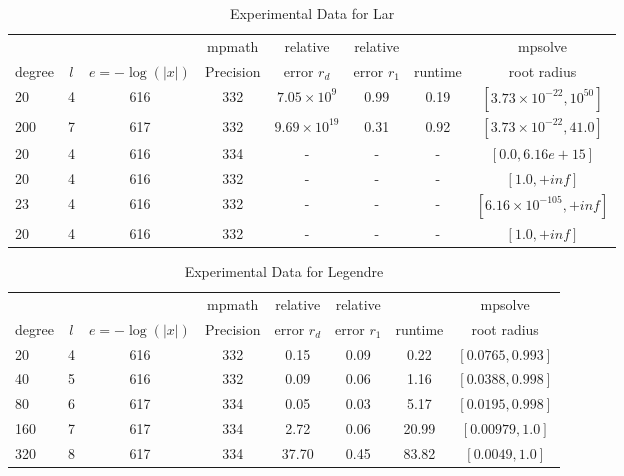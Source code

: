 \documentclass[sigconf]{acmart}
\begin{document}
\begin{table}[t]
\caption{Experimental Data for Lar}
\label{tab:lar}
\vskip 0.15in
\begin{center}
\begin{small}
\begin{sc}
\begin{tabular}{lccccccc}
\toprule
&  &  & mpmath & relative  & relative &  & mpsolve \\
degree  & $l$& $e=-\log(|x|)$& Precision &error $r_d$       & error $r_1$ &runtime& root radius\\
\midrule
   20  & 4 & 616 & 332 & $7.05 \times 10^9$ & 0.99 & 0.19 & $[3.73 \times 10^{-22}, 10^{50}]$ \\ %
  200 & 7 & 617 & 332 & $9.69 \times 10^{19}$ & 0.31 & 0.92 & $[3.73 \times 10^{-22}, 41.0]$\\ %
    20 & 4 & 616 & 334 & - & - & - & $[0.0, 6.16e+15]$\\ %
    20 & 4 & 616 & 332 & - & - & - & $[1.0, +inf]$\\ %
    23 & 4 & 616 & 332 & - & - & - & $[6.16\times 10^{-105}, +inf]$\\ %
    20 & 4 & 616 & 332 &- & - & - & $[1.0, +inf]$\\ %
\bottomrule
\end{tabular}
\end{sc}
\end{small}
\end{center}
\vskip -0.1in
\end{table}

\begin{table}[t]
\caption{Experimental Data for Legendre}
\label{tab:legendre}
\vskip 0.15in
\begin{center}
\begin{small}
\begin{sc}
\begin{tabular}{lccccccc}
\toprule
&  &  & mpmath & relative  & relative &  & mpsolve \\
degree  & $l$& $e=-\log(|x|)$& Precision &error $r_d$       & error $r_1$ &runtime& root radius\\
\midrule
   20 & 4 & 616 & 332 & 0.15 & 0.09 & 0.22 & $[0.0765,0.993]$ \\
   40 & 5 & 616 & 332 & 0.09 & 0.06 & 1.16 & $[0.0388,0.998]$\\
   80 & 6 & 617 & 334 & 0.05 & 0.03 & 5.17 & $[0.0195,0.998]$\\
 160 & 7 & 617 & 334 & 2.72 & 0.06 & 20.99 & $[0.00979,1.0]$\\
 320 & 8 & 617 & 334 & 37.70 & 0.45 & 83.82 & $[0.0049,1.0]$\\
\bottomrule
\end{tabular}
\end{sc}
\end{small}
\end{center}
\vskip -0.1in
\end{table}
\end{document}
